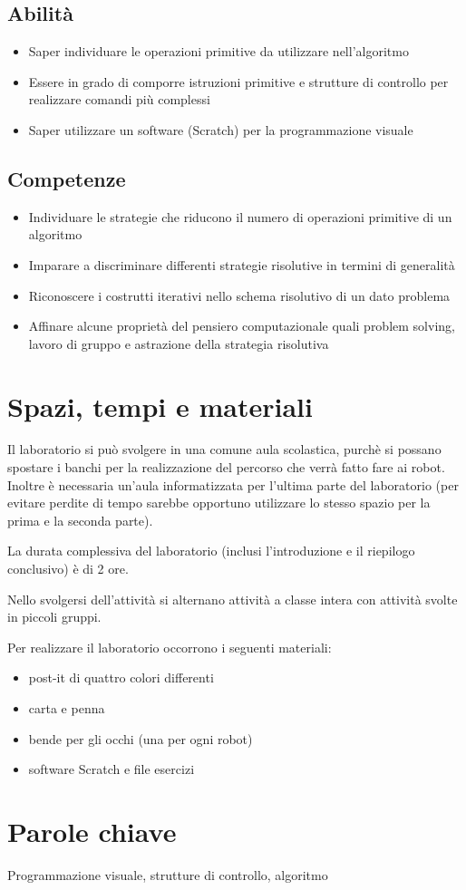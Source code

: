 \documentclass[12pt]{article}
\begin{document}
\subsection{Abilità}
\begin{itemize}
\item Saper individuare le operazioni primitive da utilizzare nell’algoritmo
\item Essere in grado di comporre istruzioni primitive e strutture di controllo per realizzare comandi più complessi
\item Saper utilizzare un software (Scratch) per la programmazione visuale
\end{itemize}

\subsection{Competenze}
\begin{itemize}
\item Individuare le strategie che riducono il numero di operazioni primitive di un algoritmo
\item Imparare a discriminare differenti strategie risolutive in termini di generalità
\item Riconoscere i costrutti iterativi nello schema risolutivo di un dato problema
\item Affinare alcune proprietà del pensiero computazionale quali problem solving, lavoro di gruppo e astrazione della strategia risolutiva
\end{itemize}
%
%
\section{Spazi, tempi e materiali}
Il laboratorio si può svolgere in una comune aula scolastica, purchè si possano spostare i banchi per la realizzazione del percorso che verrà fatto fare ai robot. Inoltre è necessaria un'aula informatizzata per l'ultima parte del laboratorio (per evitare perdite di tempo sarebbe opportuno utilizzare lo stesso spazio per la prima e la seconda parte).

La durata complessiva del laboratorio (inclusi l'introduzione e il riepilogo conclusivo) è di 2 ore.

Nello svolgersi dell'attività si alternano attività a classe intera con attività svolte in piccoli gruppi.

Per realizzare il laboratorio occorrono i seguenti materiali:
\begin{itemize}
\item post-it di quattro colori differenti
\item carta e penna
\item bende per gli occhi (una per ogni robot)
\item software Scratch e file esercizi
\end{itemize}
%
%
\section{Parole chiave}
Programmazione visuale, strutture di controllo, algoritmo
%
% 
\end{document}
